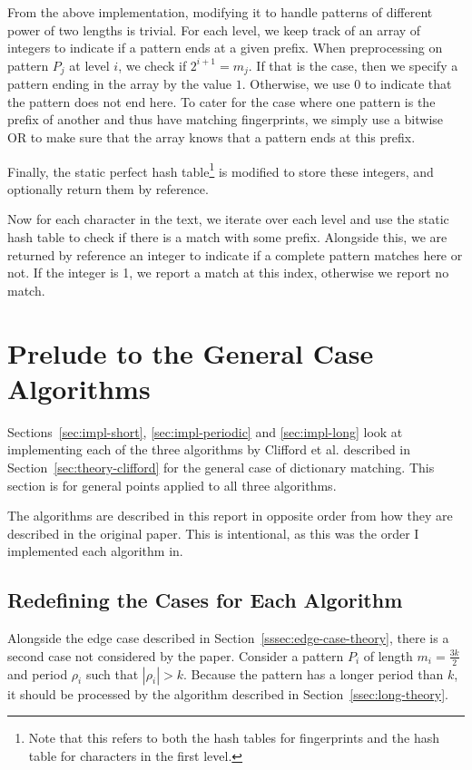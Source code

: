 \documentclass[ %
                    author={Dominic Joseph Moylett},
                    degree={MEng},
                     title={Dictionary Matching with Fingerprints},
                  subtitle={An Empirical Analysis},
                      type={Research},
                      year={2014} ]{dissertation}
\begin{document}
From the above implementation, modifying it to handle patterns of different power of two lengths is trivial. For each level, we keep track of an array of integers to indicate if a pattern ends at a given prefix. When preprocessing on pattern $P_j$ at level $i$, we check if $2^{i + 1} = m_j$. If that is the case, then we specify a pattern ending in the array by the value $1$. Otherwise, we use $0$ to indicate that the pattern does not end here. To cater for the case where one pattern is the prefix of another and thus have matching fingerprints, we simply use a bitwise OR to make sure that the array knows that a pattern ends at this prefix.

Finally, the static perfect hash table\footnote{Note that this refers to both the hash tables for fingerprints and the hash table for characters in the first level.} is modified to store these integers, and optionally return them by reference.

Now for each character in the text, we iterate over each level and use the static hash table to check if there is a match with some prefix. Alongside this, we are returned by reference an integer to indicate if a complete pattern matches here or not. If the integer is 1, we report a match at this index, otherwise we report no match.

\section{Prelude to the General Case Algorithms}

Sections~\ref{sec:impl-short}, \ref{sec:impl-periodic} and \ref{sec:impl-long} look at implementing each of the three algorithms by Clifford et al. described in Section~\ref{sec:theory-clifford} for the general case of dictionary matching. This section is for general points applied to all three algorithms.

The algorithms are described in this report in opposite order from how they are described in the original paper. This is intentional, as this was the order I implemented each algorithm in.

\subsection{Redefining the Cases for Each Algorithm}

Alongside the edge case described in Section~\ref{sssec:edge-case-theory}, there is a second case not considered by the paper. Consider a pattern $P_i$ of length $m_i = \frac{3k}{2}$ and period $\rho_i$ such that $|\rho_i| > k$. Because the pattern has a longer period than $k$, it should be processed by the algorithm described in Section~\ref{ssec:long-theory}.
\end{document}

